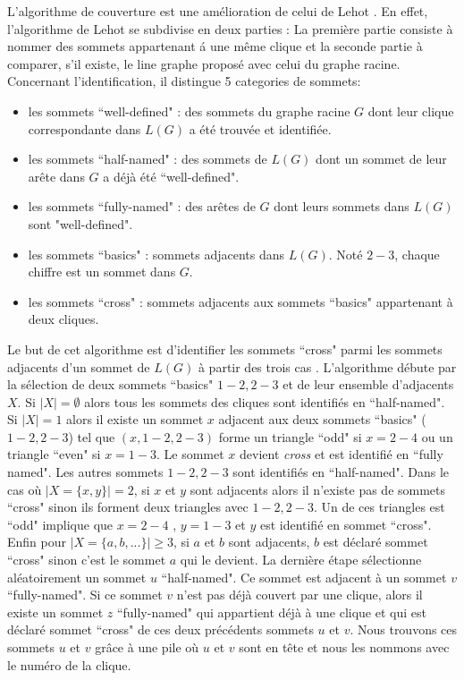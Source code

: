 L'algorithme de couverture est une am\'elioration de  celui de Lehot \cite{decompositionEnCliquesParArcs}.
En effet, l'algorithme de Lehot se subdivise en deux parties : 
La premi\`ere partie consiste \`a nommer des sommets appartenant \'a une m\^eme clique et la seconde partie \`a comparer, s'il existe, le line graphe propos\'e avec celui du graphe racine. 
Concernant l'identification, il distingue 5 categories de sommets:
\begin{itemize}
\item les sommets ``well-defined" : des sommets du graphe racine $G$ dont leur clique correspondante dans $L(G)$ a \'et\'e trouv\'ee et identifi\'ee.
\item les sommets ``half-named" : des sommets de $L(G)$ dont un sommet de leur ar\^ete dans $G$ a d\'ej\`a \'et\'e ``well-defined".
\item les sommets ``fully-named" : des ar\^etes de $G$ dont leurs sommets dans $L(G)$ sont "well-defined".
\item les sommets ``basics" : sommets adjacents dans $L(G)$. Not\'e $2-3$, chaque chiffre est un sommet dans $G$.
\item les sommets ``cross" : sommets adjacents aux sommets ``basics" appartenant \`a deux cliques.
\end{itemize}
Le but de cet algorithme est d'identifier les sommets ``cross" parmi les sommets adjacents d'un sommet de $L(G)$ \`a partir des trois cas \cite{decompositionEnCliquesParArcs}. \newline
L'algorithme d\'ebute par la s\'election de deux sommets ``basics" $1-2, 2-3$ et de leur ensemble d'adjacents $X$.
Si $|X| = \emptyset$ alors tous les sommets des cliques sont identifi\'es en ``half-named".
Si $|X| = 1$ alors il existe un sommet $x$ adjacent aux deux sommets ``basics" ($1-2,2-3$) tel que $(x,1-2,2-3)$ forme un triangle ``odd" si $x=2-4$ ou un triangle ``even" si $x=1-3$. Le sommet $x$ devient {\em cross} et est identifi\'e en ``fully named". Les autres sommets $1-2,2-3$ sont identifi\'es en ``half-named".
Dans le cas o\`u  $|X = \{x,y\}|=2$, si $x$ et $y$ sont adjacents alors il n'existe pas de sommets ``cross" sinon ils forment deux triangles avec $1-2,2-3$. Un de ces triangles est ``odd" implique que $x=2-4$ , $y=1-3$ et $y$ est identifi\'e en sommet ``cross".
Enfin pour $|X =\{ a,b,...\}| \ge 3$, si $a$ et $b$ sont adjacents, $b$ est d\'eclar\'e sommet ``cross" sinon c'est le sommet $a$ qui le devient.
La derni\`ere \'etape s\'electionne al\'eatoirement un sommet $u$ ``half-named". Ce sommet est adjacent \`a un sommet $v$ ``fully-named". Si ce sommet $v$ n'est pas d\'ej\`a couvert par une clique, alors il existe un sommet $z$ ``fully-named" qui appartient d\'ej\`a \`a une clique et qui est d\'eclar\'e sommet ``cross" de ces deux pr\'ec\'edents sommets $u$ et $v$. Nous trouvons ces sommets $u$ et $v$ gr\^ace \`a une pile o\`u $u$ et $v$ sont en t\^ete et nous les nommons avec le num\'ero de la clique. 
